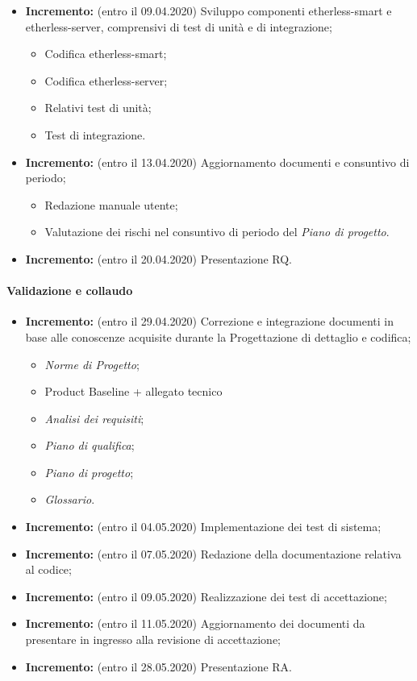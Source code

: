 \begin{itemize}
	\item \textbf{ Incremento:} (entro il 09.04.2020) Sviluppo componenti etherless-smart e etherless-server, comprensivi di test di unità e di integrazione;
  \begin{itemize}
    \item Codifica etherless-smart;
    \item Codifica etherless-server;
    \item Relativi test di unità;
    \item Test di integrazione.
  \end{itemize}
	\item \textbf{ Incremento:} (entro il 13.04.2020) Aggiornamento documenti e consuntivo di periodo;
  \begin{itemize}
    \item Redazione manuale utente;
    \item Valutazione dei rischi nel consuntivo di periodo del \textit{Piano di progetto}\docs.
  \end{itemize}
	\item \textbf{ Incremento:} (entro il 20.04.2020) Presentazione RQ.
\end{itemize}
\paragraph{Validazione e collaudo }
\begin{itemize}
  \item \textbf{ Incremento:} (entro il 29.04.2020) Correzione e integrazione documenti in base alle conoscenze acquisite durante la Progettazione di dettaglio e codifica;
  \begin{itemize}
    \item \textit{Norme di Progetto}\docs;
    \item Product Baseline + allegato tecnico
    \item \textit{Analisi dei requisiti}\docs;
    \item \textit{Piano di qualifica}\docs;
    \item \textit{Piano di progetto}\docs;
    \item \textit{Glossario}\docs.
  \end{itemize}
	\item \textbf{ Incremento:} (entro il 04.05.2020) Implementazione dei test di sistema;
	\item \textbf{ Incremento:} (entro il 07.05.2020) Redazione della documentazione relativa al codice;
	\item \textbf{ Incremento:} (entro il 09.05.2020) Realizzazione dei test di accettazione;
	\item \textbf{ Incremento:} (entro il 11.05.2020) Aggiornamento dei documenti da presentare in ingresso alla revisione di accettazione;
	\item \textbf{ Incremento:} (entro il 28.05.2020) Presentazione RA.
\end{itemize}
